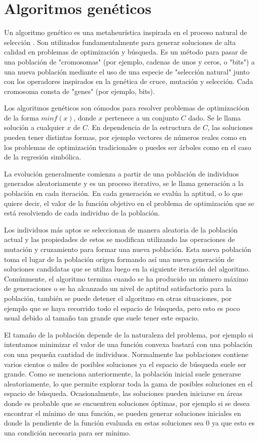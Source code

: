 \section{Algoritmos genéticos}

Un algoritmo genético es una metaheurística inspirada en el proceso natural de selección \cite{mitchell1998introduction}. Son utilizados fundamentalmente para generar soluciones de alta calidad en problemas de optimización y búsqueda. Es un método para pasar de una población de "cromosomas" (por ejemplo, cadenas de unos y ceros, o "bits") a una nueva población mediante el uso de una especie de "selección natural" junto con los operadores inspirados en la genética de cruce, mutación y selección. Cada cromosoma consta de "genes" (por ejemplo, bits).

Los algoritmos genéticos son cómodos para resolver problemas de optimizacióon de la forma $min f(x)$, donde $x$ pertenece a un conjunto $C$ dado. Se le llama solución a cualquier $x$ de $C$. En dependencia de la estructura de $C$, las soluciones pueden tener distintas formas, por ejemplo vectores de números reales como en los problemas de optimización tradicionales o puedes ser árboles como en el caso de la regresión simbólica.

La evolución generalmente comienza a partir de una población de individuos generados aleatoriamente y es un proceso iterativo, se le llama generación a la población en cada iteración. En cada generación se evalúa la aptitud, o lo que quiere decir, el valor de la función objetivo en el problema de optimización que se está resolviendo de cada individuo de la población.

Los individuos más aptos se seleccionan de manera aleatoria de la población actual y las propiedades de estos se modifican utilizando las operaciones de mutación y cruzamiento para formar una nueva población. Esta nueva población toma el lugar de la población origen formando así una nueva generación de soluciones candidatas que se utiliza luego en la siguiente iteración del algoritmo. Comúnmente, el algoritmo termina cuando se ha producido un número máximo de generaciones o se ha alcanzado un nivel de aptitud satisfactorio para la población, también se puede detener el algoritmo en otras situaciones, por ejemplo que se haya recorrido todo el espacio de búsqueda, pero esto es poco usual debido al tamaño tan grande que suele tener este espacio.

El tamaño de la población depende de la naturaleza del problema, por ejemplo si intentamos minimizar el valor de una función convexa bastará con una población con una pequeña cantidad de individuos. Normalmente las poblaciones contiene varios cientos o miles de posibles soluciones ya el espacio de búsqueda suele ser grande. Como se menciona anteriormente, la población inicial suele generarse aleatoriamente, lo que permite explorar toda la gama de posibles soluciones en el espacio de búsqueda. Ocasionalmente, las soluciones pueden iniciarse en áreas donde es probable que se encuentren soluciones óptimas, por ejemplo si se desea encontrar el mínimo de una función, se pueden generar soluciones iniciales en donde la pendiente de la función evaluada en estas soluciones sea $0$ ya que esto es una condición necesaria para ser mínimo.

